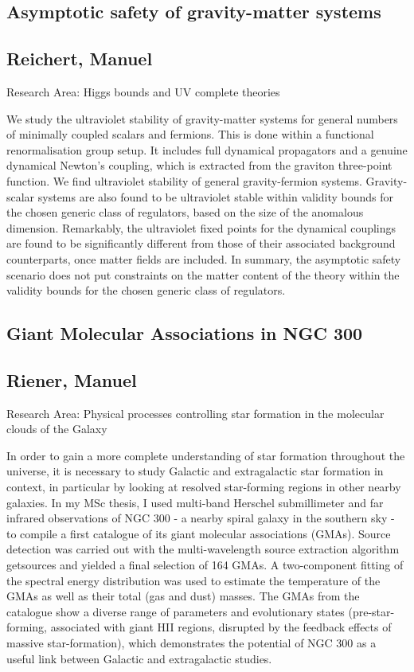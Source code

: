 \subsection*{\centering \large Asymptotic safety of gravity-matter systems}
\subsection*{\centering \normalsize Reichert, Manuel}
Research Area: Higgs bounds and UV complete theories\newline

\noindent We study the ultraviolet stability of gravity-matter systems for general numbers of minimally coupled scalars and fermions. This is done within a functional renormalisation group setup. It includes full dynamical propagators and a genuine dynamical Newton's coupling, which is extracted from the graviton three-point function. We find ultraviolet stability of general gravity-fermion systems. Gravity-scalar systems are also found to be ultraviolet stable within validity bounds for the chosen generic class of regulators, based on the size of the anomalous dimension. Remarkably, the ultraviolet fixed points for the dynamical couplings are found to be significantly different from those of their associated background counterparts, once matter fields are included. In summary, the asymptotic safety scenario does not put constraints on the matter content of the theory within the validity bounds for the chosen generic class of regulators.
\newpage
\subsection*{\centering \large Giant Molecular Associations in NGC 300}
\subsection*{\centering \normalsize Riener, Manuel}
Research Area: Physical processes controlling star formation in the molecular clouds of the Galaxy\newline

\noindent In order to gain a more complete understanding of star formation throughout the universe, it is necessary to study Galactic and extragalactic star formation in context, in particular by looking at resolved star-forming regions in other nearby galaxies. In my MSc thesis, I used multi-band Herschel submillimeter and far infrared observations of NGC 300 - a nearby spiral galaxy in the southern sky - to compile a first catalogue of its giant molecular associations (GMAs). Source detection was carried out with the multi-wavelength source extraction algorithm getsources and yielded a final selection of 164 GMAs. A two-component fitting of the spectral energy distribution was used to estimate the temperature of the GMAs as well as their total (gas and dust) masses. The GMAs from the catalogue show a diverse range of parameters and evolutionary states (pre-star-forming, associated with giant HII regions, disrupted by the feedback effects of massive star-formation), which demonstrates the potential of NGC 300 as a useful link between Galactic and extragalactic studies.


